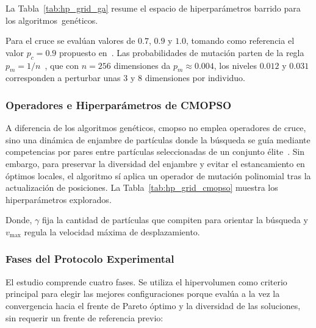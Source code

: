 La Tabla~\ref{tab:hp_grid_ga} resume el espacio de hiperparámetros barrido para los algoritmos~genéticos.



Para el cruce se evalúan valores de $0.7$, $0.9$ y $1.0$, tomando como referencia el valor $p_c = 0.9$ propuesto en~\cite{deb2002nsga2}. Las probabilidades de mutación parten de la regla $p_m = 1/n$~\cite{deb2002nsga2}, que con $n = 256$ dimensiones da $p_m \approx 0.004$, los niveles $0.012$ y $0.031$ corresponden a perturbar unas 3 y 8 dimensiones por individuo.

\subsubsection{Operadores e Hiperparámetros de CMOPSO}
\label{subsubsec:hp_cmopso}

A diferencia de los algoritmos genéticos, \acrshort{cmopso} no emplea operadores de cruce, sino una dinámica de enjambre de partículas donde la búsqueda se guía mediante competencias por pares entre partículas seleccionadas de un conjunto élite~\cite{zhang2018competitive}. Sin embargo, para preservar la diversidad del enjambre y evitar el estancamiento en óptimos locales, el algoritmo sí aplica un operador de mutación polinomial tras la actualización de posiciones. La Tabla~\ref{tab:hp_grid_cmopso} muestra los hiperparámetros explorados.



Donde, $\gamma$ fija la cantidad de partículas que compiten para orientar la búsqueda y $v_{\text{max}}$ regula la velocidad máxima de desplazamiento.

\subsubsection{Fases del Protocolo Experimental}
\label{subsubsec:etapas_protocolo}

El estudio comprende cuatro fases. Se utiliza el hipervolumen como criterio principal para elegir las mejores configuraciones porque evalúa a la vez la convergencia hacia el frente de Pareto óptimo y la diversidad de las soluciones, sin requerir un frente de referencia previo:

